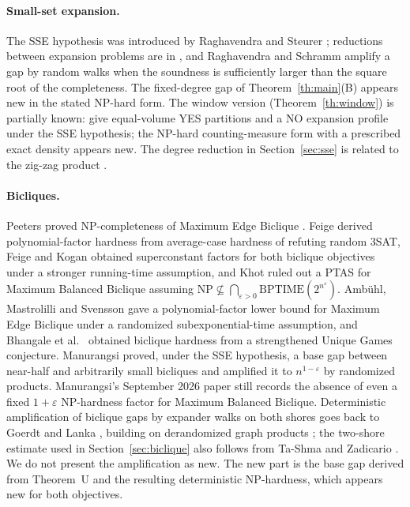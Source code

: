 \documentclass[11pt,letterpaper]{article}
\theoremstyle{definition}
\theoremstyle{remark}
\newcommand{\eps}{\varepsilon}
\begin{document}
\paragraph{Small-set expansion.}
The SSE hypothesis was introduced by Raghavendra and Steurer \cite{rs10};
reductions between expansion problems are in \cite{rst12}, and Raghavendra
and Schramm \cite{rsch14} amplify a gap by random walks when the soundness
is sufficiently larger than the square root of the completeness. The
fixed-degree gap of Theorem~\ref{th:main}(B) appears new in the stated
NP-hard form. The window version (Theorem~\ref{th:window}) is partially
known: \cite[Theorem~3.5 and Corollary~3.6]{rst12} give equal-volume YES
partitions and a NO expansion profile under the SSE hypothesis; the NP-hard
counting-measure form with a prescribed exact density appears new. The
degree reduction in Section~\ref{sec:sse} is related to the zig-zag product
\cite{rvw02}.

\paragraph{Bicliques.}
Peeters proved NP-completeness of Maximum Edge Biclique \cite{pee03}. Feige
\cite{fei02} derived polynomial-factor hardness from average-case hardness
of refuting random 3SAT, Feige and Kogan \cite{fk04} obtained superconstant
factors for both biclique objectives under a stronger running-time
assumption, and Khot \cite{kho06} ruled out a PTAS for Maximum Balanced
Biclique assuming \(\mathrm{NP}\not\subseteq\bigcap_{\eps>0}
\mathrm{BPTIME}(2^{n^\eps})\). Ambühl, Mastrolilli and Svensson
\cite[Theorem~1.4]{ams11} gave a polynomial-factor lower bound for Maximum
Edge Biclique under a randomized subexponential-time assumption, and
Bhangale et al.\ \cite{bhangale16} obtained biclique hardness from a
strengthened Unique Games conjecture. Manurangsi \cite{man17icalp,man18}
proved, under the SSE hypothesis, a base gap between near-half and
arbitrarily small bicliques and amplified it to \(n^{1-\eps}\) by
randomized products. Manurangsi's September 2026 paper \cite{man26} still
records the absence of even a fixed \(1+\eps\) NP-hardness factor for
Maximum Balanced Biclique. Deterministic amplification of biclique gaps by
expander walks on both shores goes back to Goerdt and Lanka
\cite[Section~4]{gl04}, building on derandomized graph products
\cite{afwz95}; the two-shore estimate used in Section~\ref{sec:biclique}
also follows from Ta-Shma and Zadicario \cite[Proposition~22]{tz24}. We do
not present the amplification as new. The new part is the base gap derived
from Theorem~U and the resulting deterministic NP-hardness, which appears
new for both objectives.
\end{document}
